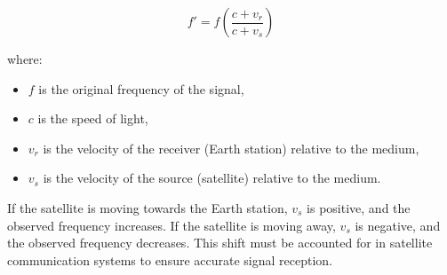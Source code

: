 \[
f' = f \left( \frac{c + v_r}{c + v_s} \right)
\]

where:
\begin{itemize}
    \item \( f \) is the original frequency of the signal,
    \item \( c \) is the speed of light,
    \item \( v_r \) is the velocity of the receiver (Earth station) relative to the medium,
    \item \( v_s \) is the velocity of the source (satellite) relative to the medium.
\end{itemize}

If the satellite is moving towards the Earth station, \( v_s \) is positive, and the observed frequency increases. If the satellite is moving away, \( v_s \) is negative, and the observed frequency decreases. This shift must be accounted for in satellite communication systems to ensure accurate signal reception.

